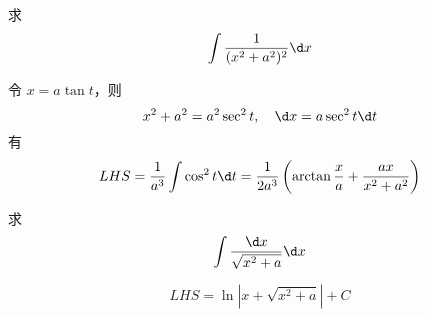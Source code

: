 \begin{problem}[000014]
求
\[ \int \frac{1}{(x^2+a^2)^2} \d x \]
\end{problem}
\begin{solution}
	令 $x = a \tan t$，则
	\[ x^2 + a^2 = a^2 \sec^2 t, \quad \d x = a \sec^2 t \d t \]
	有
	\[ LHS =  \frac{1}{a^3}\int \cos^2 t \d t = \frac{1}{2a^3} \left( \arctan \frac{x}{a} + \frac{ax}{x^2+a^2} \right) \]
\end{solution}


\begin{problem}[000015]
求
\[ \int \frac{\d x}{\sqrt{x^2 + a}} \d x \]
\end{problem}
\begin{solution}
	\[ LHS =  \ln |x + \sqrt{x^2+a}| + C \]
\end{solution}
